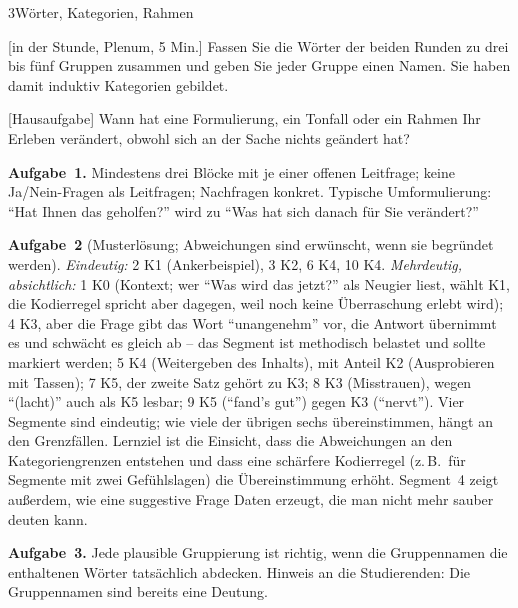 \begin{uebungsblattb}{3}{Wörter, Kategorien, Rahmen}

[in der Stunde, Plenum, 5 Min.]
Fassen Sie die Wörter der beiden Runden zu drei bis fünf Gruppen
zusammen und geben Sie jeder Gruppe einen Namen. Sie haben damit induktiv
Kategorien gebildet.

[Hausaufgabe]
Wann hat eine Formulierung, ein Tonfall oder ein Rahmen Ihr Erleben
verändert, obwohl sich an der Sache nichts geändert hat?

\begin{lehrhinweis}[Erwartungshorizont]
\textbf{Aufgabe~1.} Mindestens drei Blöcke mit je einer offenen Leitfrage;
keine Ja/Nein-Fragen als Leitfragen; Nachfragen konkret. Typische
Umformulierung: \enquote{Hat Ihnen das geholfen?} wird zu \enquote{Was
hat sich danach für Sie verändert?}

\textbf{Aufgabe~2} (Musterlösung; Abweichungen sind erwünscht, wenn sie
begründet werden).
\emph{Eindeutig:} 2 K1 (Ankerbeispiel), 3 K2, 6 K4, 10 K4.
\emph{Mehrdeutig, absichtlich:} 1 K0 (Kontext; wer \enquote{Was wird das
jetzt?} als Neugier liest, wählt K1, die Kodierregel spricht aber dagegen,
weil noch keine Überraschung erlebt wird); 4 K3, aber die Frage gibt das
Wort \enquote{unangenehm} vor, die Antwort übernimmt es und schwächt es
gleich ab -- das Segment ist methodisch belastet und sollte markiert
werden; 5 K4 (Weitergeben des Inhalts), mit Anteil K2 (Ausprobieren mit
Tassen); 7 K5, der zweite Satz gehört zu K3; 8 K3 (Misstrauen),
wegen \enquote{(lacht)} auch als K5 lesbar; 9 K5 (\enquote{fand's gut})
gegen K3 (\enquote{nervt}). Vier Segmente sind eindeutig; wie viele der
übrigen sechs übereinstimmen, hängt an den Grenzfällen. Lernziel ist die
Einsicht, dass
die Abweichungen an den Kategoriengrenzen entstehen und dass eine
schärfere Kodierregel (z.\,B.\ für Segmente mit zwei Gefühlslagen)
die Übereinstimmung erhöht. Segment~4 zeigt außerdem, wie eine
suggestive Frage Daten erzeugt, die man nicht mehr sauber deuten kann.

\textbf{Aufgabe~3.} Jede plausible Gruppierung ist richtig, wenn die
Gruppennamen die enthaltenen Wörter tatsächlich abdecken. Hinweis an die
Studierenden: Die Gruppennamen sind bereits eine Deutung.
\end{lehrhinweis}
\end{uebungsblattb}
